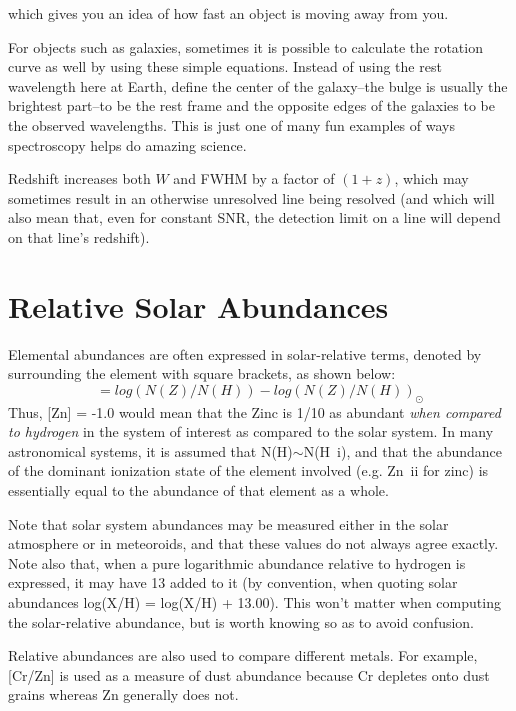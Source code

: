 which gives you an idea of how fast an object is moving away from you.

For objects such as galaxies, sometimes it is possible to calculate the rotation curve as well by using these simple equations. Instead of using the rest wavelength here at Earth, define the center of the galaxy--the bulge is usually the brightest part--to be the rest frame and the opposite edges of the galaxies to be the observed wavelengths. This is just one of many fun examples of ways spectroscopy helps do amazing science.


Redshift increases both $W$ and FWHM by a factor of $(1 + z)$, which may sometimes result in an otherwise unresolved line being resolved (and which will also mean that, even for constant SNR, the detection limit on a line will depend on that line's redshift).

\section{Relative Solar Abundances}

Elemental abundances are often expressed in solar-relative terms, denoted by surrounding the element with square brackets, as shown below:
\begin{equation}
	[Z] = log(N(Z)/N(H)) - log(N(Z)/N(H))_\odot
\end{equation}
Thus, [Zn] = -1.0 would mean that the Zinc is 1/10 as abundant \emph{when compared to hydrogen} in the system of interest as compared to the solar system. In many astronomical systems, it is assumed that N(H)$\sim$N(H~{\sc i}), and that the abundance of the dominant ionization state of the element involved (e.g. Zn~{\sc ii} for zinc) is essentially equal to the abundance of that element as a whole.

Note that solar system abundances may be measured either in the solar atmosphere or in meteoroids, and that these values do not always agree exactly. Note also that, when a pure logarithmic abundance relative to hydrogen is expressed, it may have 13 added to it (by convention, when quoting solar abundances log(X/H) = log(X/H) + 13.00). This won't matter when computing the solar-relative abundance, but is worth knowing so as to avoid confusion.

Relative abundances are also used to compare different metals. For example, [Cr/Zn] is used as a measure of dust abundance because Cr depletes onto dust grains whereas Zn generally does not.

